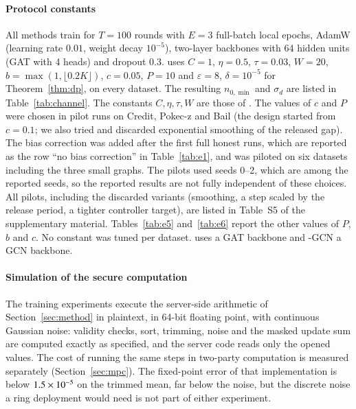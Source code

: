 \paragraph{Protocol constants}
All methods train for $T=100$ rounds with $E=3$ full-batch local epochs, AdamW (learning rate $0.01$, weight decay $10^{-5}$), two-layer backbones with 64 hidden units (GAT with 4 heads) and dropout $0.3$. \rt{} uses $C=1$, $\eta=0.5$, $\tau=0.03$, $W=20$, $b=\max(1,\lfloor0.2K\rfloor)$, $c=0.05$, $P=10$ and $\varepsilon=8$, $\delta=10^{-5}$ for Theorem~\ref{thm:dp}, on every dataset. The resulting $n_{0,\min}$ and $\sigma_d$ are listed in Table~\ref{tab:channel}. The constants $C,\eta,\tau,W$ are those of \clamp{}. The values of $c$ and $P$ were chosen in pilot runs on Credit, Pokec-z and Bail (the design started from $c=0.1$; we also tried and discarded exponential smoothing of the released gap). The bias correction was added after the first full honest runs, which are reported as the row ``no bias correction'' in Table~\ref{tab:e1}, and was piloted on six datasets including the three small graphs. The pilots used seeds 0--2, which are among the reported seeds, so the reported results are not fully independent of these choices. All pilots, including the discarded variants (smoothing, a step scaled by the release period, a tighter controller target), are listed in Table~S5 of the supplementary material. Tables~\ref{tab:e5} and~\ref{tab:e6} report the other values of $P$, $b$ and $c$. No constant was tuned per dataset. \rt{} uses a GAT backbone and \rt{}-GCN a GCN backbone.

\paragraph{Simulation of the secure computation}
The training experiments execute the server-side arithmetic of Section~\ref{sec:method} in plaintext, in 64-bit floating point, with continuous Gaussian noise: validity checks, sort, trimming, noise and the masked update sum are computed exactly as specified, and the server code reads only the opened values. The cost of running the same steps in two-party computation is measured separately (Section~\ref{sec:mpc}). The fixed-point error of that implementation is below $1.5\times10^{-5}$ on the trimmed mean, far below the noise, but the discrete noise a ring deployment would need is not part of either experiment.


